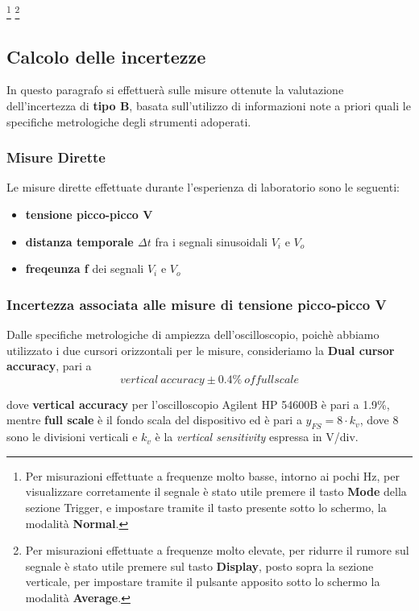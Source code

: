 \footnote{Per misurazioni effettuate a frequenze molto basse, intorno ai pochi Hz, per visualizzare corretamente il segnale è stato utile premere il tasto \textbf{Mode} della sezione Trigger, e impostare tramite il tasto presente sotto lo schermo, la modalità \textbf{Normal}. }
\footnote{Per misurazioni effettuate a frequenze molto elevate, per ridurre il rumore sul segnale è stato utile premere sul tasto \textbf{Display}, posto sopra la sezione verticale, per impostare tramite il pulsante apposito sotto lo schermo la modalità \textbf{Average}.}

\clearpage

\subsection{Calcolo delle incertezze}
In questo paragrafo si effettuerà sulle misure ottenute la valutazione dell'incertezza di \textbf{tipo B}, basata sull'utilizzo di informazioni note a priori quali le specifiche metrologiche degli strumenti adoperati.

\subsubsection{Misure Dirette}

Le misure dirette effettuate durante l'esperienza di laboratorio sono le seguenti:
\begin{itemize}
    \item \textbf{tensione picco-picco V}
    \item \textbf{distanza temporale $\Delta t$}  fra i segnali sinusoidali $V_i$ e $V_o$
    \item \textbf{freqeunza f} dei segnali $V_i$ e $V_o$ 
\end{itemize}


\subsubsection*{Incertezza associata alle misure di tensione picco-picco V}

Dalle specifiche metrologiche di ampiezza dell'oscilloscopio, poichè abbiamo utilizzato i due cursori orizzontali per le misure, consideriamo la \textbf{Dual cursor accuracy}, pari a 
\[vertical \ accuracy \pm 0.4\% \ of full scale\]

dove \textbf{vertical accuracy} per l'oscilloscopio Agilent HP 54600B è pari a 1.9\%, mentre \textbf{full scale} è il fondo scala del dispositivo ed è pari a $y_{FS} = 8 \cdot k_v$, dove 8 sono le divisioni verticali e $k_v$ è la \emph{vertical sensitivity} espressa in V/div.

